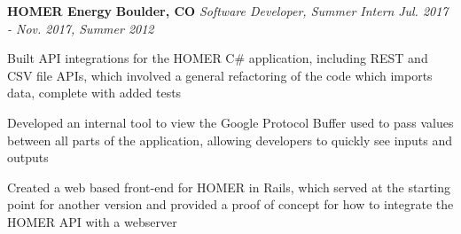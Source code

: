 \item
\headerrow
{\textbf{HOMER Energy}}
{\textbf{Boulder, CO}}
\headerrow
{\emph{Software Developer, Summer Intern}}
{\emph{Jul. 2017 - Nov. 2017, Summer 2012}}
\begin{itemize*}
    \item Built API integrations for the HOMER C\# application, including REST
    and CSV file APIs, which involved a general refactoring of the code which
    imports data, complete with added tests
    \item Developed an internal tool to view the Google Protocol Buffer used to
    pass values between all parts of the application, allowing developers to
    quickly see inputs and outputs
    \item Created a web based front-end for HOMER in Rails, which served at the
    starting point for another version and provided a proof of concept for
    how to integrate the HOMER API with a webserver
\end{itemize*}
